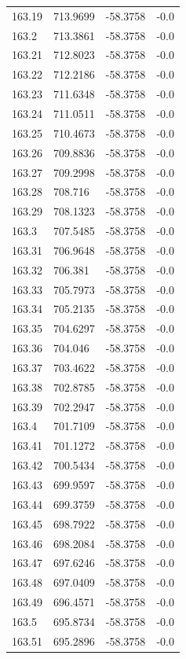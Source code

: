 \begin{table}[H]
\begin{tabular}{llll}
163.19 & 713.9699 & -58.3758 & -0.0 \\
163.2 & 713.3861 & -58.3758 & -0.0 \\
163.21 & 712.8023 & -58.3758 & -0.0 \\
163.22 & 712.2186 & -58.3758 & -0.0 \\
163.23 & 711.6348 & -58.3758 & -0.0 \\
163.24 & 711.0511 & -58.3758 & -0.0 \\
163.25 & 710.4673 & -58.3758 & -0.0 \\
163.26 & 709.8836 & -58.3758 & -0.0 \\
163.27 & 709.2998 & -58.3758 & -0.0 \\
163.28 & 708.716 & -58.3758 & -0.0 \\
163.29 & 708.1323 & -58.3758 & -0.0 \\
163.3 & 707.5485 & -58.3758 & -0.0 \\
163.31 & 706.9648 & -58.3758 & -0.0 \\
163.32 & 706.381 & -58.3758 & -0.0 \\
163.33 & 705.7973 & -58.3758 & -0.0 \\
163.34 & 705.2135 & -58.3758 & -0.0 \\
163.35 & 704.6297 & -58.3758 & -0.0 \\
163.36 & 704.046 & -58.3758 & -0.0 \\
163.37 & 703.4622 & -58.3758 & -0.0 \\
163.38 & 702.8785 & -58.3758 & -0.0 \\
163.39 & 702.2947 & -58.3758 & -0.0 \\
163.4 & 701.7109 & -58.3758 & -0.0 \\
163.41 & 701.1272 & -58.3758 & -0.0 \\
163.42 & 700.5434 & -58.3758 & -0.0 \\
163.43 & 699.9597 & -58.3758 & -0.0 \\
163.44 & 699.3759 & -58.3758 & -0.0 \\
163.45 & 698.7922 & -58.3758 & -0.0 \\
163.46 & 698.2084 & -58.3758 & -0.0 \\
163.47 & 697.6246 & -58.3758 & -0.0 \\
163.48 & 697.0409 & -58.3758 & -0.0 \\
163.49 & 696.4571 & -58.3758 & -0.0 \\
163.5 & 695.8734 & -58.3758 & -0.0 \\
163.51 & 695.2896 & -58.3758 & -0.0 \\

\end{tabular}
\end{table}
